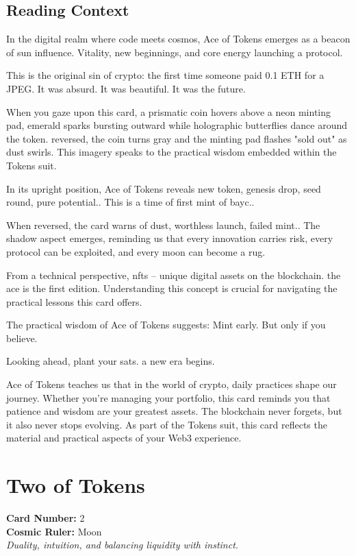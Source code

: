 \documentclass[11pt,oneside]{book}
\begin{document}
\begin{minipage}[t]{0.55\textwidth}
  \subsection*{Reading Context}
  In the digital realm where code meets cosmos, Ace of Tokens emerges as a beacon of sun influence. Vitality, new beginnings, and core energy launching a protocol.

  This is the original sin of crypto: the first time someone paid 0.1 ETH for a JPEG. It was absurd. It was beautiful. It was the future.

  When you gaze upon this card, a prismatic coin hovers above a neon minting pad, emerald sparks bursting outward while holographic butterflies dance around the token. reversed, the coin turns gray and the minting pad flashes "sold out" as dust swirls. This imagery speaks to the practical wisdom embedded within the Tokens suit.

  In its upright position, Ace of Tokens reveals new token, genesis drop, seed round, pure potential.. This is a time of first mint of bayc..

  When reversed, the card warns of dust, worthless launch, failed mint.. The shadow aspect emerges, reminding us that every innovation carries risk, every protocol can be exploited, and every moon can become a rug.

  From a technical perspective, nfts – unique digital assets on the blockchain. the ace is the first edition. Understanding this concept is crucial for navigating the practical lessons this card offers.

  The practical wisdom of Ace of Tokens suggests: Mint early. But only if you believe.

  Looking ahead, plant your sats. a new era begins.

  Ace of Tokens teaches us that in the world of crypto, daily practices shape our journey. Whether you're managing your portfolio, this card reminds you that patience and wisdom are your greatest assets. The blockchain never forgets, but it also never stops evolving. As part of the Tokens suit, this card reflects the material and practical aspects of your Web3 experience.

\end{minipage}

\newpage
\section*{Two of Tokens}

\begin{minipage}[t]{0.55\textwidth}
  \vspace{0pt}
  \textbf{Card Number:} 2\\  \textbf{Cosmic Ruler:} Moon\\  \textit{Duality, intuition, and balancing liquidity with instinct.}
\end{minipage}
\end{document}
